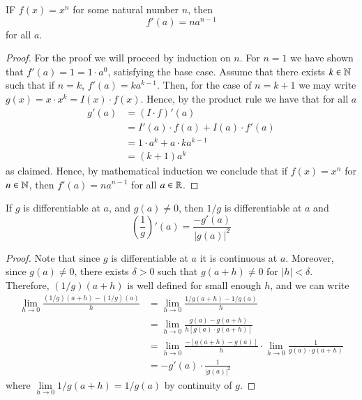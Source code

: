 \documentclass[12pt, a4paper, oneside, openright, titlepage]{book}
\begin{document}
\begin{thm}
    IF $f(x) = x^n$ for some natural number $n$, then $$f'(a) = na^{n-1}$$ for all $a$.
\end{thm}
\begin{proof}
    For the proof we will proceed by induction on $n$. For $n = 1$ we have shown that $f'(a) = 1 = 1\cdot a^0$, satisfying the base case. Assume that there exists $k \in \mathbb N$ such that if $n = k$, $f'(a) = ka^{k-1}$. Then, for the case of $n = k+1$ we may write $g(x) = x\cdot x^k = I(x)\cdot f(x)$. Hence, by the product rule we have that for all $a$ \begin{align*}
        g'(a) &= (I\cdot f)'(a) \\
        &= I'(a) \cdot f(a) + I(a) \cdot f'(a) \\
        &= 1\cdot a^k + a\cdot ka^{k-1} \\
        &= (k+1)a^k
    \end{align*}
    as claimed. Hence, by mathematical induction we conclude that if $f(x) = x^n$ for $n \in \mathbb N$, then $f'(a) = na^{n-1}$ for all $a \in \mathbb R$.
\end{proof}


\begin{thm}
    If $g$ is differentiable at $a$, and $g(a) \neq 0$, then $1/g$ is differentiable at $a$ and $$\left(\frac{1}{g}\right)'(a) = \frac{-g'(a)}{|g(a)|^2}$$
\end{thm}
\begin{proof}
    Note that since $g$ is differentiable at $a$ it is continuous at $a$. Moreover, since $g(a) \neq 0$, there exists $\delta > 0$ such that $g(a+h) \neq 0$ for $|h| < \delta$. Therefore, $(1/g)(a+h)$ is well defined for small enough $h$, and we can write \begin{align*}
        \lim\limits_{h\rightarrow 0}\frac{(1/g)(a+h) - (1/g)(a)}{h} &= \lim\limits_{h\rightarrow 0}\frac{1/g(a+h) - 1/g(a)}{h} \\
        &= \lim\limits_{h\rightarrow 0}\frac{g(a) - g(a+h)}{h[g(a)\cdot g(a+h)]} \\
        &= \lim\limits_{h\rightarrow 0}\frac{-[g(a+h)-g(a)]}{h}\cdot \lim\limits_{h\rightarrow 0}\frac{1}{g(a)\cdot g(a+h)} \\
        &= -g'(a)\cdot \frac{1}{|g(a)|^2}
    \end{align*}
    where $\lim\limits_{h\rightarrow 0}1/g(a+h) = 1/g(a)$ by continuity of $g$.
\end{proof}
\end{document}
